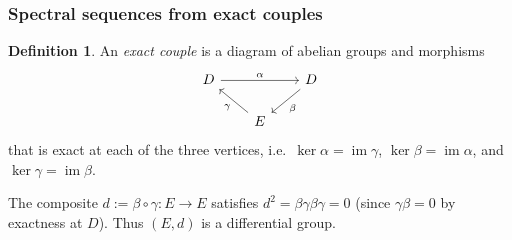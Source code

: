 \documentclass[12pt,a4paper]{article}
\theoremstyle{definition}
\newtheorem{definition}[theorem]{Definition}
\begin{document}
\subsubsection{Spectral sequences from exact couples}
\label{subsubsec:exact-couples}

\begin{definition}\label{def:exact-couple}
An \emph{exact couple} is a diagram of abelian groups and morphisms
\[
\begin{tikzcd}[column sep=2em, row sep=1.6em]
  D \ar[rr,"\alpha"] && D \ar[dl,"\beta"]\\
  & E \ar[ul,"\gamma"] &
\end{tikzcd}
\]
that is exact at each of the three vertices, i.e.\
$\ker\alpha=\operatorname{im}\gamma$, $\ker\beta=\operatorname{im}\alpha$, and
$\ker\gamma=\operatorname{im}\beta$.
\end{definition}

The composite $d:=\beta\circ\gamma:E\to E$ satisfies $d^2=\beta\gamma\beta\gamma=0$
(since $\gamma\beta=0$ by exactness at $D$).  Thus $(E,d)$ is a differential group.
\end{document}
